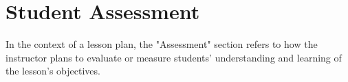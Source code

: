 \documentclass[main.tex]{subfiles}
\begin{document}
\section*{Student Assessment} 
\setlength{\parindent}{0in}

In the context of a lesson plan, the "Assessment" section refers to how the instructor plans to evaluate or measure students' understanding and learning of the lesson's objectives.
\end{document}
